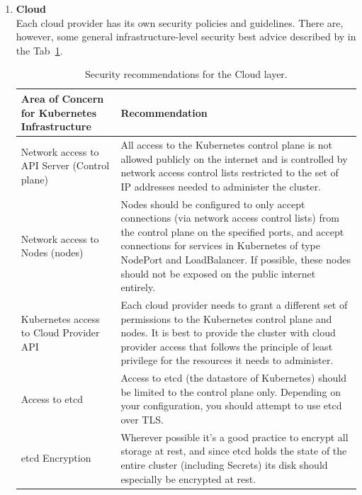 \begin{enumerate}

\item \textbf{Cloud} \\
Each cloud provider has its own security policies and guidelines. There are, however, some general infrastructure-level security best advice described by in the Tab~\ref{tab:cloud-security-recommendations}.

\begin{table}[H]
    \begin{center}
        \begin{tabular}{ | p{} | p{} | } 
         \hline
         \textbf{Area of Concern for Kubernetes Infrastructure} & \textbf{Recommendation} \\ 
         \hline
         Network access to API Server (Control plane) & All access to the Kubernetes control plane is not allowed publicly on the internet and is controlled by network access control lists restricted to the set of IP addresses needed to administer the cluster. \\ 
         \hline
         Network access to Nodes (nodes)  & Nodes should be configured to only accept connections (via network access control lists) from the control plane on the specified ports, and accept connections for services in Kubernetes of type NodePort and LoadBalancer. If possible, these nodes should not be exposed on the public internet entirely. \\ 
         \hline
         Kubernetes access to Cloud Provider API & Each cloud provider needs to grant a different set of permissions to the Kubernetes control plane and nodes. It is best to provide the cluster with cloud provider access that follows the principle of least privilege for the resources it needs to administer. \\
         \hline
         Access to etcd & Access to etcd (the datastore of Kubernetes) should be limited to the control plane only. Depending on your configuration, you should attempt to use etcd over TLS. \\
         \hline
         etcd Encryption & Wherever possible it's a good practice to encrypt all storage at rest, and since etcd holds the state of the entire cluster (including Secrets) its disk should especially be encrypted at rest. \\
         \hline
        \end{tabular}
    \end{center}
    \caption{Security recommendations for the Cloud layer.}
    \label{tab:cloud-security-recommendations}
\end{table}


\end{enumerate}

